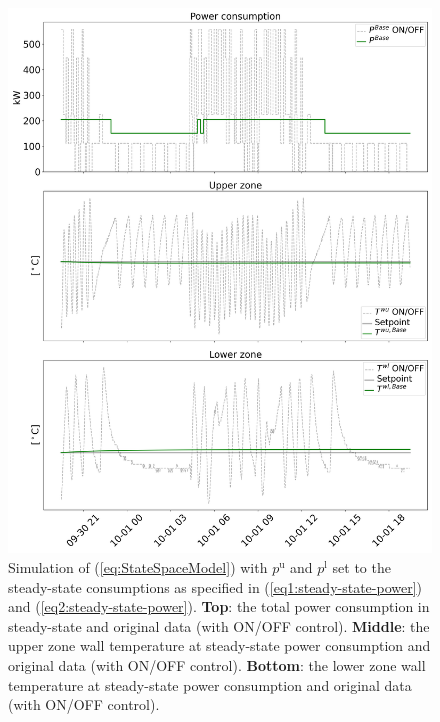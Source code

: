 \documentclass[conference]{IEEEtran}
\begin{document}
{\begin{figure}[t]
    \centering
    \includegraphics[width=\columnwidth]{../figures/4thOrderModelVisualizationSteadyState.png}
    \caption{\small{Simulation of (\ref{eq:StateSpaceModel}) with $p^{\text{u}}$ and $p^{\text{l}}$ set to the steady-state consumptions as specified in (\ref{eq1:steady-state-power}) and (\ref{eq2:steady-state-power}). \textbf{Top}: the total power consumption in steady-state and original data (with ON/OFF control). \textbf{Middle}: the upper zone wall temperature at steady-state power consumption and original data (with ON/OFF control). \textbf{Bottom}: the lower zone wall temperature at steady-state power consumption and original data (with ON/OFF control). \vspace{-3mm}}}
    \label{fig:4thOrderModelVisualizationSteadyState}
\end{figure}








}
\end{document}
